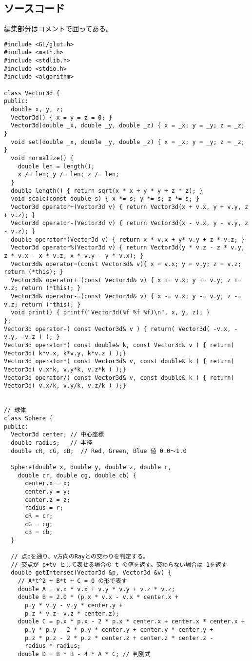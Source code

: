 \documentclass{scrartcl}
\begin{document}
\subsection{ソースコード}
\label{sec:org4fd4944}
編集部分はコメントで囲ってある。\\
\begin{verbatim}
#include <GL/glut.h>
#include <math.h>
#include <stdlib.h>
#include <stdio.h>
#include <algorithm>

class Vector3d {
public:
  double x, y, z;
  Vector3d() { x = y = z = 0; }
  Vector3d(double _x, double _y, double _z) { x = _x; y = _y; z = _z; }
  void set(double _x, double _y, double _z) { x = _x; y = _y; z = _z; }
  void normalize() {
    double len = length();
    x /= len; y /= len; z /= len;
  }
  double length() { return sqrt(x * x + y * y + z * z); }
  void scale(const double s) { x *= s; y *= s; z *= s; }
  Vector3d operator+(Vector3d v) { return Vector3d(x + v.x, y + v.y, z + v.z); }
  Vector3d operator-(Vector3d v) { return Vector3d(x - v.x, y - v.y, z - v.z); }
  double operator*(Vector3d v) { return x * v.x + y* v.y + z * v.z; }
  Vector3d operator%(Vector3d v) { return Vector3d(y * v.z - z * v.y, z * v.x - x * v.z, x * v.y - y * v.x); }
  Vector3d& operator=(const Vector3d& v){ x = v.x; y = v.y; z = v.z; return (*this); }
  Vector3d& operator+=(const Vector3d& v) { x += v.x; y += v.y; z += v.z; return (*this); }
  Vector3d& operator-=(const Vector3d& v) { x -= v.x; y -= v.y; z -= v.z; return (*this); }
  void print() { printf("Vector3d(%f %f %f)\n", x, y, z); }
};
Vector3d operator-( const Vector3d& v ) { return( Vector3d( -v.x, -v.y, -v.z ) ); }
Vector3d operator*( const double& k, const Vector3d& v ) { return( Vector3d( k*v.x, k*v.y, k*v.z ) );}
Vector3d operator*( const Vector3d& v, const double& k ) { return( Vector3d( v.x*k, v.y*k, v.z*k ) );}
Vector3d operator/( const Vector3d& v, const double& k ) { return( Vector3d( v.x/k, v.y/k, v.z/k ) );}


// 球体
class Sphere {
public:
  Vector3d center; // 中心座標
  double radius;   // 半径
  double cR, cG, cB;  // Red, Green, Blue 値 0.0〜1.0

  Sphere(double x, double y, double z, double r,
    double cr, double cg, double cb) {
      center.x = x;
      center.y = y;
      center.z = z;
      radius = r;
      cR = cr;
      cG = cg;
      cB = cb;
  }

  // 点pを通り、v方向のRayとの交わりを判定する。
  // 交点が p+tv として表せる場合の t の値を返す。交わらない場合は-1を返す
  double getIntersec(Vector3d &p, Vector3d &v) {
    // A*t^2 + B*t + C = 0 の形で表す
    double A = v.x * v.x + v.y * v.y + v.z * v.z;
    double B = 2.0 * (p.x * v.x - v.x * center.x +
      p.y * v.y - v.y * center.y +
      p.z * v.z- v.z * center.z);
    double C = p.x * p.x - 2 * p.x * center.x + center.x * center.x +
      p.y * p.y - 2 * p.y * center.y + center.y * center.y +
      p.z * p.z - 2 * p.z * center.z + center.z * center.z -
      radius * radius;
    double D = B * B - 4 * A * C; // 判別式


\end{verbatim}
\end{document}
